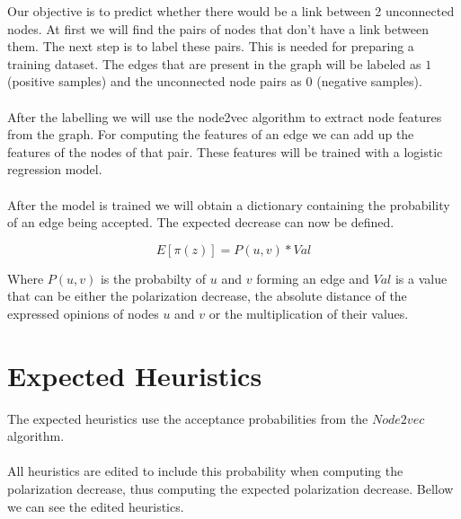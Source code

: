 Our objective is to predict whether there would be a link between 2 unconnected nodes. At first we will find the pairs of nodes that don't have a link between them.	
The next step is to label these pairs. This is needed for preparing a training dataset. 
The edges that are present in the graph will be labeled as $1$ (positive samples) and the unconnected node pairs as $0$ (negative samples).		
\\
\\
\noindent After the labelling we will use the node2vec algorithm to extract node features from the graph. For computing the features of an edge we can add up the features of the nodes of that pair. These features will be trained with a logistic regression model.
\\
\\
\noindent After the model is trained we will obtain a dictionary containing the probability of an edge being accepted. The expected decrease can now be defined.
 \vspace{25pt}

 \begin{equation} 
	 E[\pi(z)] = P(u,v) * Val
\end{equation}

\vspace{35pt}

\noindent Where $P(u,v)$ is the probabilty of $u$ and $v$ forming an edge and $Val$ is a value that can be either the polarization decrease, the absolute distance of the expressed opinions of nodes $u$ and $v$ or the multiplication of their values.
 		
\clearpage

\section{Expected Heuristics}
\label{sec:expectedHeur}

The expected heuristics use the acceptance probabilities from the $Node2vec$ algorithm. 
\\
\\
All heuristics are edited to include this probability when computing the polarization decrease, thus computing the expected polarization decrease. Bellow we can see the edited heuristics.
 \vspace{45pt}

